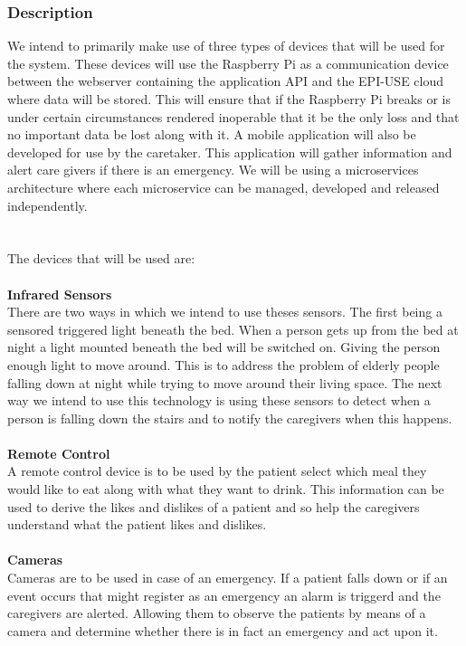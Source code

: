 \documentclass{article}
\begin{document}
\subsubsection{Description}
We intend to primarily make use of three types of devices that will be used for the system. These devices will use the Raspberry Pi as a communication device between the webserver containing the application API and the EPI-USE cloud where data will be stored. This will ensure that if the Raspberry Pi breaks or is under certain circumstances rendered inoperable that it be the only loss and that no important data be lost along with it. A mobile application will also be developed for use by the caretaker. This application will gather information and alert care givers if there is an emergency. We will be using a microservices architecture where each microservice can be managed, developed and released independently. \\ \\ \\The devices that will be used are:\\ \\
\textbf{Infrared Sensors} \\
There are two ways in which we intend to use theses sensors. The first being a sensored triggered light beneath the bed. When a person gets up from the bed at night a light mounted beneath the bed will be switched on. Giving the person enough light to move around. This is to address the problem of elderly people falling down at night while trying to move around their living space. The next way we intend to use this technology is using these sensors to detect when a person is falling down the stairs and to notify the caregivers when this happens. \\ \\
\textbf{Remote Control} \\
A remote control device is to be used by the patient select which meal they would like to eat along with what they want to drink. This information can be used to derive the likes and dislikes of a patient and so help the caregivers understand what the patient likes and dislikes. \\ \\
\textbf{Cameras} \\
Cameras are to be used in case of an emergency. If a patient falls down or if an event occurs that might register as an emergency an alarm is triggerd and the caregivers are alerted. Allowing them to observe the patients by means of a camera and determine whether there is in fact an emergency and act upon it.
\end{document}
